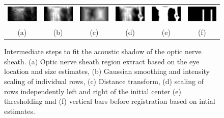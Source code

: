 \documentclass{llncs}
\begin{document}
\begin{figure}
\centering
\begin{tabular}{cccccc}
\includegraphics[height=0.35in]{019-nerve.png} &
\includegraphics[height=0.35in]{019-nerve-smooth.png} &
\includegraphics[height=0.35in]{019-nerve-distance.png} &
\includegraphics[height=0.35in]{019-nerve-scaled.png} &
\includegraphics[height=0.35in]{019-nerve-thres.png} &         
\includegraphics[height=0.35in]{019-nerve-moving.png} \\         
(a) & (b) & (c) & (d) & (e) & (f)
\end{tabular}
\caption{
\label{fig:algorithm-nerve}
Intermediate steps to fit the acoustic shadow of the optic nerve sheath. (a)
Optic nerve sheath region extract based on the eye location and size estimates, (b)
Gaussian smoothing and intensity scaling of individual rows, (c) Distance
transform, (d) scaling of rows independently left and right of the initial
center (e) thresholding and (f) vertical bars before registration based on intial
estimates.
}
\end{figure}
\end{document}

